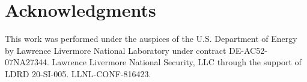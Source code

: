\documentclass[letterpaper]{article} %
\begin{document}
\section{Acknowledgments}
This work was performed under the auspices of the U.S. Department of Energy by Lawrence Livermore National Laboratory under contract DE-AC52-07NA27344.
Lawrence Livermore National Security, LLC through the support of LDRD 20-SI-005.
LLNL-CONF-816423.



\end{document}
